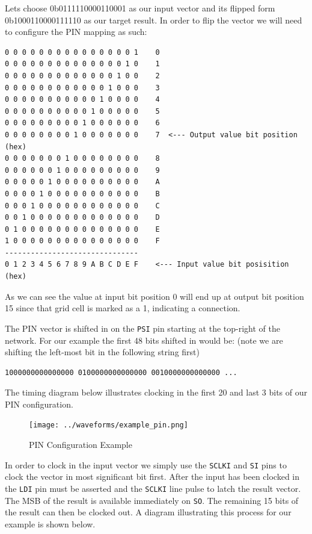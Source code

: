 Lets choose 0b0111110000110001 as our input vector and its flipped form
0b1000110000111110 as our target result. In order to flip the vector we
will need to configure the PIN mapping as such:

\begin{verbatim}
0 0 0 0 0 0 0 0 0 0 0 0 0 0 0 1    0
0 0 0 0 0 0 0 0 0 0 0 0 0 0 1 0    1
0 0 0 0 0 0 0 0 0 0 0 0 0 1 0 0    2
0 0 0 0 0 0 0 0 0 0 0 0 1 0 0 0    3
0 0 0 0 0 0 0 0 0 0 0 1 0 0 0 0    4
0 0 0 0 0 0 0 0 0 0 1 0 0 0 0 0    5
0 0 0 0 0 0 0 0 0 1 0 0 0 0 0 0    6
0 0 0 0 0 0 0 0 1 0 0 0 0 0 0 0    7  <--- Output value bit position (hex)
0 0 0 0 0 0 0 1 0 0 0 0 0 0 0 0    8
0 0 0 0 0 0 1 0 0 0 0 0 0 0 0 0    9
0 0 0 0 0 1 0 0 0 0 0 0 0 0 0 0    A
0 0 0 0 1 0 0 0 0 0 0 0 0 0 0 0    B
0 0 0 1 0 0 0 0 0 0 0 0 0 0 0 0    C
0 0 1 0 0 0 0 0 0 0 0 0 0 0 0 0    D
0 1 0 0 0 0 0 0 0 0 0 0 0 0 0 0    E
1 0 0 0 0 0 0 0 0 0 0 0 0 0 0 0    F
-------------------------------
0 1 2 3 4 5 6 7 8 9 A B C D E F    <--- Input value bit posisition (hex)
\end{verbatim}

As we can see the value at input bit position 0 will end up at output bit
position 15 since that grid cell is marked as a 1, indicating a connection.

The PIN vector is shifted in on the \texttt{PSI} pin starting at the top-right
of the network. For our example the first 48 bits shifted in would be: (note we
are shifting the left-most bit in the following string first)

\begin{verbatim}
1000000000000000 0100000000000000 0010000000000000 ...
\end{verbatim}

The timing diagram below illustrates clocking in the first 20 and last 3 bits of our PIN configuration.

\begin{figure}[H]
    \centering
    \texttt{[image: ../waveforms/example\_pin.png]}
    \caption{PIN Configuration Example}
\end{figure}

In order to clock in the input vector we simply use the \texttt{SCLKI} and
\texttt{SI} pins to clock the vector in most significant bit first. After the
input has been clocked in the \texttt{LDI} pin must be asserted and the
\texttt{SCLKI} line pulse to latch the result vector. The MSB of the result is
available immediately on \texttt{SO}. The remaining 15 bits of the result can
then be clocked out. A diagram illustrating this process for our example is
shown below.

